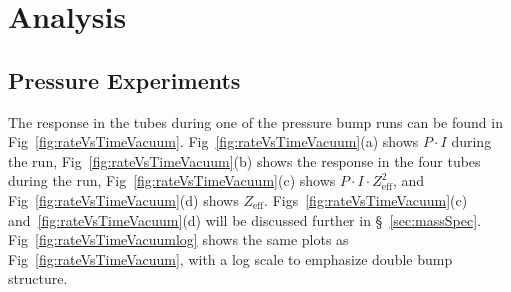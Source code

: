 \chapter{Analysis}
\label{chap:Anal}




\section{Pressure Experiments}
\label{sec:PBump}

The response in the \he tubes during one of the pressure bump runs can be found in Fig~\ref{fig:rateVsTimeVacuum}. Fig~\ref{fig:rateVsTimeVacuum}(a) shows $P\cdot I$ during the run, Fig~\ref{fig:rateVsTimeVacuum}(b) shows the response in the four \he tubes during the run, Fig~\ref{fig:rateVsTimeVacuum}(c) shows $P\cdot I\cdot Z_{\mathrm{eff}}^2$, and Fig~\ref{fig:rateVsTimeVacuum}(d) shows $Z_{\mathrm{eff}}$. Figs~\ref{fig:rateVsTimeVacuum}(c) and~\ref{fig:rateVsTimeVacuum}(d) will be discussed further in \S~\ref{sec:massSpec}. Fig~\ref{fig:rateVsTimeVacuumlog} shows the same plots as Fig~\ref{fig:rateVsTimeVacuum}, with a log scale to emphasize double bump structure.

